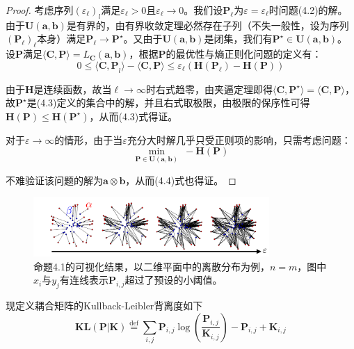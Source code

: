 \documentclass[cn,10pt,math=newtx,citestyle=gb7714-2015,bibstyle=gb7714-2015]{elegantbook}
\begin{document}
\begin{proof}
考虑序列$(\varepsilon_\ell)_l$满足$\varepsilon_\ell>0$且$\varepsilon_\ell\to 0$。我们设$\mathbf{P}_\ell$为$\varepsilon=\varepsilon_\ell$时问题(4.2)的解。由于$\mathbf{U(a,b)}$是有界的，由有界收敛定理必然存在子列（不失一般性，设为序列$(\mathbf{P}_\ell)_\ell$本身）满足$\mathbf{P}_\ell\to \mathbf{P}^\star$。又由于$\mathbf{U(a,b)}$是闭集，我们有$\mathbf{P}^\star \in\mathbf{U(a,b)}$。设$\mathbf{P}$满足$\langle \mathbf{C,P} \rangle = L_\mathbf{C}(\mathbf{a,b})$，根据$\mathbf{P}$的最优性与熵正则化问题的定义有：
\begin{equation}
    \label{4.5}
    0 \leq \langle \mathbf{C,P}_l \rangle - \langle \mathbf{C,P} \rangle \leq \varepsilon_\ell(\mathbf{H}(\mathbf{P}_\ell)-\mathbf{H}(\mathbf{P}))
\end{equation}

由于$\mathbf{H}$是连续函数，故当$\ell \to \infty$时右式趋零，由夹逼定理即得$\langle \mathbf{C,P}^\star \rangle = \langle \mathbf{C,P} \rangle$，故$\mathbf{P}^\star$是(4.3)定义的集合中的解，并且右式取极限，由极限的保序性可得$\mathbf{H(P)}\leq \mathbf{H}(\mathbf{P}^\star)$，从而(4.3)式得证。

对于$\varepsilon\to \infty$的情形，由于当$\varepsilon$充分大时解几乎只受正则项的影响，只需考虑问题：
\begin{equation*}
    \min\limits_{\mathbf{P}\in\mathbf{U(a,b)}}\; -\mathbf{H(P)}
\end{equation*}

不难验证该问题的解为$\mathbf{a}\otimes \mathbf{b}$，从而(4.4)式也得证。
\end{proof}

\begin{figure}[H]
    \centering
    \includegraphics[width=0.8\textwidth]{figure/fig4.3.png}
    \caption{命题4.1的可视化结果，以二维平面中的离散分布为例，$n=m$，图中$x_i$与$y_j$有连线表示$\mathbf{P}_{i,j}$超过了预设的小阈值。}
    \label{图4.2}
\end{figure}

现定义耦合矩阵的Kullback-Leibler背离度如下
\begin{equation}
    \label{4.6}
    \mathbf{KL(P|K)} \overset{\text{def}}{=} \sum_{i,j} \mathbf{P}_{i,j} \log \left( \frac{\mathbf{P}_{i,j}}{\mathbf{K}_{i,j}} \right) - \mathbf{P}_{i,j} + \mathbf{K}_{i,j}
\end{equation}
\end{document}
